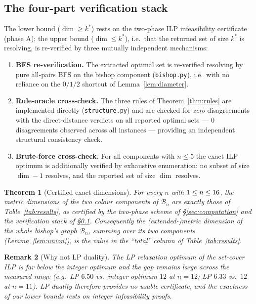 \documentclass[12pt]{article}
\newtheorem{theorem}{Theorem}
\newtheorem{remark}[theorem]{Remark}
\theoremstyle{definition}
\newcommand{\BB}{\mathcal{B}}
\begin{document}
\subsection{The four-part verification stack}\label{sec:verify}

The lower bound ($\dim\ge k^\ast$) rests on the two-phase ILP infeasibility certificate (phase A); the upper bound ($\dim\le k^\ast$), i.e.\ that the returned set of size $k^\ast$ is resolving, is re-verified by three mutually independent mechanisms:
\begin{enumerate}[label=\textup{\arabic*.},leftmargin=6mm,itemsep=2pt]
\item \textbf{BFS re-verification.} The extracted optimal set is re-verified resolving by pure all-pairs BFS on the bishop component (\texttt{bishop.py}), i.e.\ with no reliance on the $0/1/2$ shortcut of Lemma~\ref{lem:diameter}.
\item \textbf{Rule-oracle cross-check.} The three rules of Theorem~\ref{thm:rules} are implemented directly (\texttt{structure.py}) and are checked for \emph{zero} disagreements with the direct-distance verdicts on all reported optimal sets --- 0 disagreements observed across all instances --- providing an independent structural consistency check.
\item \textbf{Brute-force cross-check.} For all components with $n\le5$ the exact ILP optimum is additionally verified by exhaustive enumeration: no subset of size $\dim-1$ resolves, and the reported set of size $\dim$ resolves.
\end{enumerate}

\begin{theorem}[Certified exact dimensions]\label{thm:computed}
For every $n$ with $1\le n\le16$, the metric dimensions of the two colour components of $\BB_n$ are exactly those of Table~\ref{tab:results}, as certified by the two-phase scheme of \S\ref{sec:computation} and the verification stack of \S\ref{sec:verify}. Consequently the (extended-)metric dimension of the whole bishop's graph $\BB_n$, summing over its two components (Lemma~\ref{lem:union}), is the value in the ``total'' column of Table~\ref{tab:results}.
\end{theorem}

\begin{remark}[Why not LP duality]
The LP relaxation optimum of the set-cover ILP is far below the integer optimum and the gap remains large across the measured range (e.g.\ LP $6.50$ vs.\ integer optimum $12$ at $n=12$; LP $6.33$ vs.\ $12$ at $n=11$). LP duality therefore provides no usable certificate, and the exactness of our lower bounds rests on integer infeasibility proofs.
\end{remark}
\end{document}
